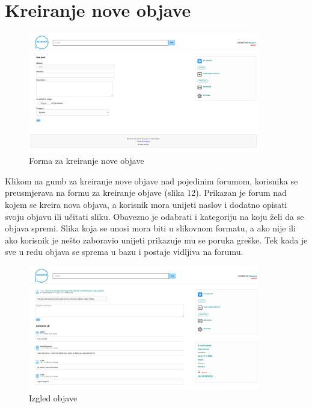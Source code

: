\documentclass{foi}
\begin{document}
\section{Kreiranje nove objave}

\begin{figure}[h!]
    \centering
    \includegraphics[width=0.9\textwidth]{slike/nova-objava.png}
    \caption{Forma za kreiranje nove objave}
\end{figure}

Klikom na gumb za kreiranje nove objave nad pojedinim forumom, korisnika se preusmjerava na formu za kreiranje objave (slika 12). Prikazan je forum nad kojem se kreira nova objava, a korisnik mora unijeti naslov i dodatno opisati svoju objavu ili učitati sliku. Obavezno je odabrati i kategoriju na koju želi da se objava spremi. Slika koja se unosi mora biti u slikovnom formatu, a ako nije ili ako korisnik je nešto zaboravio unijeti prikazuje mu se poruka greške. Tek kada je sve u redu objava se sprema u bazu i postaje vidljiva na forumu.

\begin{figure}[h!]
    \centering
    \includegraphics[width=0.9\textwidth]{slike/objava.png}
    \caption{Izgled objave}
\end{figure}
\end{document}
